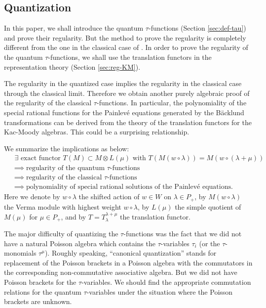 \documentclass[12pt,twoside]{article}
\theoremstyle{plain} %
\theoremstyle{definition} %
\theoremstyle{definition} %
\numberwithin{theorem}{section}
\numberwithin{equation}{section}
\numberwithin{figure}{section}
\numberwithin{table}{section}
\newcommand\secref[1]{Section \ref{#1}}
\begin{document}

\subsection{Quantization}

In this paper, we shall introduce the quantum $\tau$-functions 
(\secref{sec:def-tau}) and prove their regularity.  
But the method to prove the regularity is completely different
from the one in the classical case of \cite{NY0012028}.
In order to prove the regularity of the quantum $\tau$-functions, 
we shall use the translation functors in the representation theory
(\secref{sec:reg-KM}). 

The regularity in the quantized case implies the regularity in the classical case
through the classical limit.
Therefore we obtain another purely algebraic proof of the regularity 
of the classical $\tau$-functions.
In particular, 
the polynomiality of the special rational functions 
for the Painlev\'e equations generated by the B\"acklund transformations 
can be derived from the theory of the translation functors for the Kac-Moody algebras.
This could be a surprising relationship.

We summarize the implications as below:
\begin{align*}
 &
 \text{
   $\exists$ exact functor 
   $T(M)\subset M\otimes L(\mu)$ with 
   $T(M(w\circ\lambda))=M(w\circ(\lambda+\mu))$
 }
 \\ &
 \implies
 \text{regularity of the quantum $\tau$-functions}
 \\ &
 \implies
 \text{regularity of the classical $\tau$-functions}
 \\ &
 \implies
 \text{polynomiality of special rational solutions of the Painlev\'e equations}.
\end{align*}
Here we denote 
by $w\circ\lambda$ the shifted action of $w\in W$ on $\lambda\in P_+$, 
by $M(w\circ\lambda)$ the Verma module with highest weight $w\circ\lambda$, 
by $L(\mu)$ the simple quotient of $M(\mu)$ for $\mu\in P_+$,
and by $T=T_\lambda^{\lambda+\mu}$ the translation functor.

The major difficulty of quantizing the $\tau$-functions was the fact that
we did not have a natural Poisson algebra which contains the $\tau$-variables $\tau_i$
(or the $\tau$-monomials $\tau^\mu$).
Roughly speaking, ``canonical quantization'' stands for
replacement of the Poisson brackets in a Poisson algebra
with the commutators in the corresponding non-commutative associative algebra.
But we did not have Poisson brackets for the $\tau$-variables.
We should find the appropriate commutation relations for the quantum $\tau$-variables
under the situation where the Poisson brackets are unknown.
\end{document}
